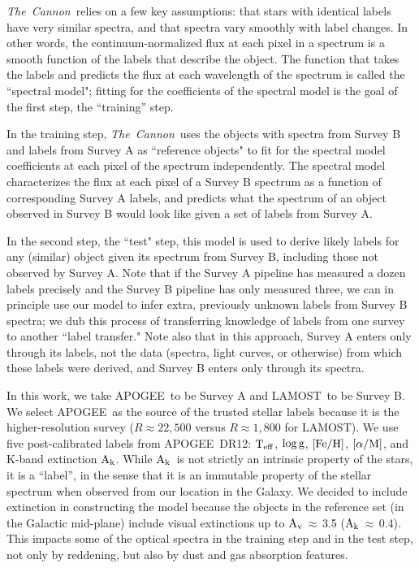 \documentclass[12pt, letterpaper, preprint]{aastex}
\newcommand{\tc}{\textsl{The~Cannon}}
\newcommand{\apogee}{APOGEE}
\newcommand{\lamost}{LAMOST}
\newcommand{\teff}{\mbox{$\rm T_{eff}$}}
\newcommand{\feh}{\mbox{$\rm [Fe/H]$}}
\newcommand{\alpham}{\mbox{$\rm [\alpha/M]$}}
\newcommand{\logg}{\mbox{$\rm \log g$}}
\newcommand{\ak}{\mbox{$\rm A_k$}}
\newcommand{\av}{\mbox{$\rm A_v$}}
\begin{document}
\tc\ relies on a few key assumptions: 
that stars with identical labels have very similar spectra, and that spectra vary smoothly with label changes.  
In other words, the continuum-normalized flux at each pixel in a spectrum is a smooth function of the labels that describe the object. 
The function that takes the labels and predicts the 
flux at each wavelength of the spectrum is called the ``spectral model"; 
fitting for the coefficients of the spectral model is the goal of the first step, 
the ``training'' step.

In the training step, \tc\ uses the objects with spectra from Survey B and labels from Survey A
as ``reference objects" to fit for the spectral model coefficients at each pixel of the spectrum independently.
The spectral model characterizes the flux at each pixel of a Survey B 
spectrum as a function of corresponding Survey A labels, and
predicts what the spectrum of an object observed in Survey B
would look like given a set of labels from Survey A. 

In the second step, the ``test" step, this model is used to derive 
likely labels for any (similar) object given its spectrum from Survey B,
including those not observed by Survey A. 
Note that if the Survey A pipeline has measured a dozen labels precisely and the 
Survey B pipeline has only measured three, we can in principle use
our model to infer extra, previously unknown labels from Survey B spectra; we dub this process of transferring knowledge of labels from one survey to another ``label transfer." 
Note also that in this approach, Survey A enters only through its labels, not the data (spectra, light curves, or otherwise) from which these labels were derived, and Survey B enters only through its spectra. 

In this work, we take \apogee\ to be Survey A and \lamost\ to be Survey B. 
We select \apogee\ as the source of the trusted stellar
labels because it is the higher-resolution survey ($R\approx22,500$ versus $R\approx1,800$ for \lamost).
We use five post-calibrated labels from \apogee\ DR12: \teff, \logg, \feh, \alpham, and K-band extinction \ak. While \ak\ is not strictly an intrinsic property of the stars, it is a ``label'',
in the sense that it is an immutable property of the stellar spectrum when observed from our location in the Galaxy.
We decided to include extinction in constructing the model because 
the objects in the reference set (in the Galactic mid-plane) 
include visual extinctions up to \av\,$\approx$\,3.5 (\ak\,$\approx$\,0.4).
This impacts some of the optical spectra in the training step and in the test step,
not only by reddening, but also by dust and gas absorption features. 
\end{document}
